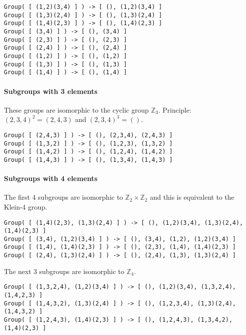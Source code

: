\begin{verbatim}
Group( [ (1,2)(3,4) ] ) -> [ (), (1,2)(3,4) ]
Group( [ (1,3)(2,4) ] ) -> [ (), (1,3)(2,4) ]
Group( [ (1,4)(2,3) ] ) -> [ (), (1,4)(2,3) ]
Group( [ (3,4) ] ) -> [ (), (3,4) ]
Group( [ (2,3) ] ) -> [ (), (2,3) ]
Group( [ (2,4) ] ) -> [ (), (2,4) ]
Group( [ (1,2) ] ) -> [ (), (1,2) ]
Group( [ (1,3) ] ) -> [ (), (1,3) ]
Group( [ (1,4) ] ) -> [ (), (1,4) ]
\end{verbatim}

\paragraph{Subgroups with 3 elements}\label{subgroups-with-3-elements}

These groups are isomorphic to the cyclic group \(\mathbb{Z}_3\).
Principle: \((2,3,4)^2 = (2,4,3)\) and \((2,3,4)^3 = ()\).

\begin{verbatim}
Group( [ (2,4,3) ] ) -> [ (), (2,3,4), (2,4,3) ]
Group( [ (1,3,2) ] ) -> [ (), (1,2,3), (1,3,2) ]
Group( [ (1,4,2) ] ) -> [ (), (1,2,4), (1,4,2) ]
Group( [ (1,4,3) ] ) -> [ (), (1,3,4), (1,4,3) ]
\end{verbatim}

\paragraph{Subgroups with 4 elements}\label{subgroups-with-4-elements}

The first 4 subgroups are isomorphic to
\(\mathbb{Z}_2 \times \mathbb{Z}_2\) and this is equivalent to the
Klein-4 group.

\begin{verbatim}
Group( [ (1,4)(2,3), (1,3)(2,4) ] ) -> [ (), (1,2)(3,4), (1,3)(2,4), (1,4)(2,3) ]
Group( [ (3,4), (1,2)(3,4) ] ) -> [ (), (3,4), (1,2), (1,2)(3,4) ]
Group( [ (1,4), (1,4)(2,3) ] ) -> [ (), (2,3), (1,4), (1,4)(2,3) ]
Group( [ (2,4), (1,3)(2,4) ] ) -> [ (), (2,4), (1,3), (1,3)(2,4) ]
\end{verbatim}

The next 3 subgroups are isomorphic to \(\mathbb{Z}_4\).

\begin{verbatim}
Group( [ (1,3,2,4), (1,2)(3,4) ] ) -> [ (), (1,2)(3,4), (1,3,2,4), (1,4,2,3) ]
Group( [ (1,4,3,2), (1,3)(2,4) ] ) -> [ (), (1,2,3,4), (1,3)(2,4), (1,4,3,2) ]
Group( [ (1,2,4,3), (1,4)(2,3) ] ) -> [ (), (1,2,4,3), (1,3,4,2), (1,4)(2,3) ]
\end{verbatim}

